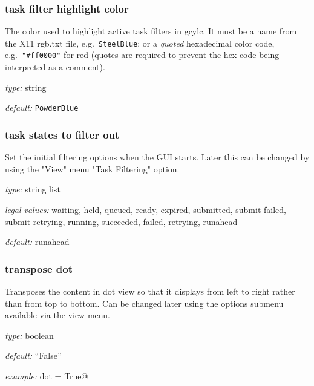\subsubsection{task filter highlight color}

The color used to highlight active task filters in gcylc. It must be a name
from the X11 rgb.txt file, e.g.\ \lstinline=SteelBlue=; or a
{\em quoted} hexadecimal color code, e.g.\ \lstinline="#ff0000"= for red (quotes
are required to prevent the hex code being interpreted as a comment).

\begin{myitemize}
    \item {\em type:} string
    \item {\em default:} \lstinline=PowderBlue=
\end{myitemize}


\subsubsection{task states to filter out}

Set the initial filtering options when the GUI starts. Later this can be
changed by using the "View" menu "Task Filtering" option.

\begin{myitemize}
\item {\em type:} string list
\item {\em legal values:} waiting, held, queued, ready, expired, submitted,
submit-failed, submit-retrying, running, succeeded, failed, retrying, runahead
\item {\em default:} runahead
\end{myitemize}


\subsubsection{transpose dot}

Transposes the content in dot view so that it displays from left to right rather
than from top to bottom. Can be changed later using the options submenu
available via the view menu.

\begin{myitemize}
    \item {\em type:} boolean
    \item {\em default:} ``False''
    \item {\em example:} \lstinline@transpose dot = True@
\end{myitemize}


